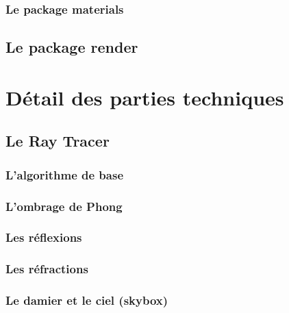 \documentclass[11pt]{article}
\begin{document}
        \subsubsection{Le package materials}
            

        \subsection{Le package render}



\section{Détail des parties techniques}
    \subsection{Le Ray Tracer}
        \subsubsection{L'algorithme de base}
            \label{rayTracingBase}

            

        \subsubsection{L'ombrage de Phong}
            \label{ombragePhong}

            

        \subsubsection{Les réflexions}

            

        \subsubsection{Les réfractions}
            \label{refractions}

        \subsubsection{Le damier et le ciel (skybox)}
            \label{checkerboardSkybox}

            
\end{document}
